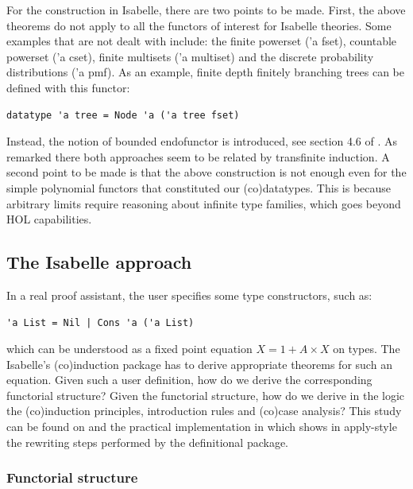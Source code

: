 \documentclass[notitlepage]{article}
\begin{document}
For the construction in Isabelle, there are two points to be made. First, the above theorems do not apply to all the functors of interest for Isabelle theories. Some examples that are not dealt with include: the finite powerset ('a fset), countable powerset ('a cset), finite multisets ('a multiset) and the discrete probability distributions ('a pmf). As an example, finite depth finitely branching trees can be defined with this functor:

\begin{lstlisting}
datatype 'a tree = Node 'a ('a tree fset)
\end{lstlisting}

Instead, the notion of bounded endofunctor is introduced, see section 4.6 of \cite{jacobs2005introduction}. As remarked there both approaches seem to be related by transfinite induction. A second point to be made is that the above construction is not enough even for the simple polynomial functors that constituted our (co)datatypes. This is because arbitrary limits require reasoning about infinite type families, which goes beyond HOL capabilities.

\subsection{The Isabelle approach}

In a real proof assistant, the user specifies some type constructors, such as:

\begin{lstlisting}
'a List = Nil | Cons 'a ('a List) 
\end{lstlisting}

which can be understood as a fixed point equation $X = 1 + A \times X$ on types. The Isabelle's (co)induction package has to derive appropriate theorems for such an equation. Given such a user definition, how do we derive the corresponding functorial structure? Given the functorial structure, how do we derive in the logic the (co)induction principles, introduction rules and (co)case analysis? This study can be found on \cite{traytel} and the practical implementation in \cite{boundednat} which shows in apply-style the rewriting steps performed by the definitional package. 


\subsubsection{Functorial structure}
\end{document}
